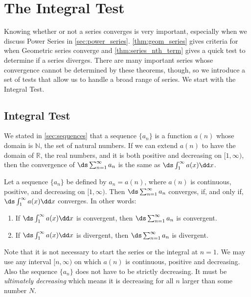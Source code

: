\section{The Integral Test}\label{sec:int_tests}

Knowing whether or not a series converges is very important, especially when we discuss Power Series in \autoref{sec:power_series}. \autoref{thm:geom_series} gives criteria for when Geometric series converge and \autoref{thm:series_nth_term} gives a quick test to determine if a series diverges. There are many important series whose convergence cannot be determined by these theorems, though, so we introduce a set of tests that allow us to handle a broad range of series. We start with the Integral Test.


\subsection{Integral Test}

We stated in \autoref{sec:sequences} that a sequence $\{a_n\}$ is a function $a(n)$ whose domain is $\mathbb{N}$, the set of natural numbers. If we can extend $a(n)$ to have the domain of $\mathbb{R}$, the real numbers, and it is both positive and decreasing on $[1,\infty)$, then the convergence of $\ds \sum_{n=1}^\infty a_n$ is the same as $\ds\int_1^\infty a(x)\dd x$. 

\begin{theorem}\label{thm:integral_test}%
Let a sequence $\{a_n\}$ be defined by $a_n=a(n)$, where $a(n)$ is continuous, positive, and decreasing on $[1,\infty)$. Then $\ds \sum_{n=1}^\infty a_n$ converges, if, and only if, $\ds\int_1^\infty a(x)\dd x$ converges. In other words:
\begin{enumerate}
\item If $\ds \int_1^\infty a(x)\dd x$ is convergent, then $\ds \sum_{n=1}^\infty a_n$ is convergent.
\item If $\ds \int_1^\infty a(x)\dd x$ is divergent, then $\ds \sum_{n=1}^\infty a_n$ is divergent.
\end{enumerate}
\end{theorem}


Note that it is not necessary to start the series or the integral at $n=1$. We may use any interval $[n,\infty)$ on which $a(n)$ is continuous, positive and decreasing. Also the sequence $\{a_n\}$ does not have to be strictly decreasing. It must be \emph{ultimately decreasing} which means it is decreasing for all $n$ larger than some number $N$.\bigskip



